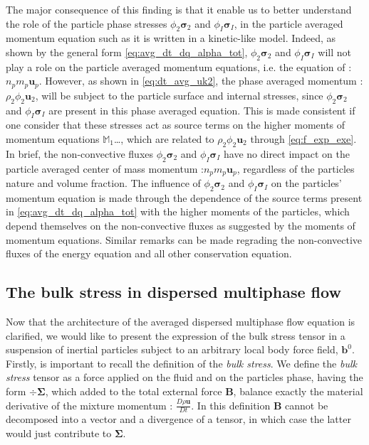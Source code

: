 The major consequence of this finding is that it enable us to better understand the role of the particle phase stresses $\phi_2\bm{\sigma}_2$ and $\phi_I\bm{\sigma}_I$, in the particle averaged momentum equation such as it is written in a kinetic-like model. 
Indeed, as shown by the general form \ref{eq:avg_dt_dq_alpha_tot}, $\phi_2\bm{\sigma}_2$ and $\phi_I\bm{\sigma}_I$ will not play a role on the particle averaged momentum equations, i.e. the equation of : $n_p m_p \textbf{u}_p$. 
However, as shown in \ref{eq:dt_avg_uk2}, the phase averaged momentum : $\rho_2 \phi_2 \textbf{u}_2$,  will be subject to the particle surface and internal stresses, since $\phi_2\bm{\sigma}_2$ and $\phi_I\bm{\sigma}_I$ are present in this phase averaged equation.
This is made consistent if one consider that these stresses act as source terms on the higher moments of momentum equations $\mathbb{M}_1$\ldots, which are related to $\rho_2 \phi_2 \textbf{u}_2$ through \ref{eq:f_exp_exe}. 
In brief, the non-convective fluxes $\phi_2\bm{\sigma}_2$ and $\phi_I\bm{\sigma}_I$  have no direct impact on the particle averaged center of mass momentum :$n_pm_p\textbf{u}_p$, regardless of the particles nature and volume fraction. 
The influence of $\phi_2\bm{\sigma}_2$ and $\phi_I\bm{\sigma}_I$ on the particles' momentum equation is made through the dependence of the source terms present in \ref{eq:avg_dt_dq_alpha_tot} with the higher moments of the particles, which depend themselves on the non-convective fluxes as suggested by the moments of momentum equations. 
Similar remarks can be made regrading the non-convective fluxes of the energy equation and all other conservation equation. 

\subsection{The bulk stress in dispersed multiphase flow}

Now that the architecture of the averaged dispersed multiphase flow equation is clarified, we would like to present the expression of the bulk stress tensor in a suspension of inertial particles subject to an arbitrary local body force field, $\textbf{b}^0$.
Firstly, is important to recall the definition of the \textit{bulk stress}. 
We define the \textit{bulk stress} tensor as a force applied on the fluid and on the particles phase, having the form $\div \bm{\Sigma}$, which added to the total external force $\textbf{B}$, balance exactly the material derivative of the mixture momentum : $\frac{D \rho \textbf{u}}{Dt}$. 
In this definition $\textbf{B}$ cannot be decomposed into a vector and a divergence of a tensor, in which case the latter would just contribute to $\bm{\Sigma}$.

